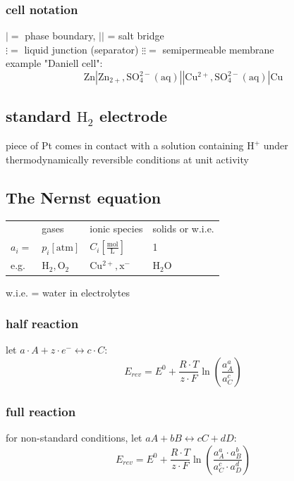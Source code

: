 \documentclass[a4paper,10pt,landscape]{scrartcl}
\begin{document}
\begin{multicols*}{3}
\subsubsection{cell notation}
$|=$ phase boundary, 
$||$ = salt bridge \\
$\vdots =$ liquid junction (separator) $\vdots\vdots =$ semipermeable membrane \\
example "Daniell cell": 
$$\mathrm{Zn|Zn_{2+},SO_4
^{2-}(aq)||Cu^{2+},SO_4
^{2-}(aq)|Cu}$$

\subsection{standard $\mathrm{H_2}$ electrode}
piece of Pt comes in contact with a solution containing $\mathrm{H^+}$ under thermodynamically reversible conditions at unit activity

\subsection{The Nernst equation}
\begin{tabular}{|p{.6cm}|p{2cm}|p{2cm}|p{3cm}|}
\hline
        & gases & ionic species & solids or w.i.e. \\

$a_i=$   & $p_i\mathrm{[atm]}$ & $C_i \mathrm{\left[\frac{mol}{L}\right]}$ & 1 \\

e.g. & $\mathrm{H_2,O_2}$ & $\mathrm{Cu^{2+},x^{-}}$ & $\mathrm{H_2O}$ \\
\end{tabular}
w.i.e. = water in electrolytes
\subsubsection{half reaction}
let $a\cdot A+z\cdot e^-\leftrightarrow c\cdot C$:
$$E_{rev}=E^0+\frac{R \cdot T}{z \cdot F}\ln \left(\frac{a_A^a}{a_C^c}\right)$$

\subsubsection{full reaction}
for non-standard conditions, let $aA+bB\leftrightarrow cC+dD$:
$$
E_{r e v}=E^0+\frac{R \cdot T}{z \cdot F} \ln \left(\frac{a_A^a \cdot a_B^b}{a_C^c \cdot a_D^d}\right)
$$
\vspace{-.3cm}

\end{multicols*}
\end{document}
